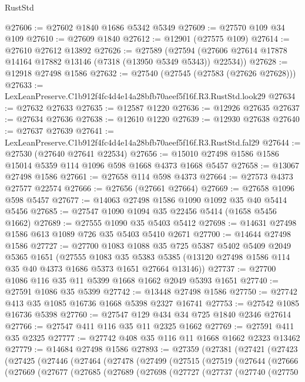 \begin{lexlean}{RustStd}
\begin{coremodule}
@27606 := @27602 @1840 @1686 @5342 @5349
@27609 := @27570 @109 @34 @109
@27610 := @27609 @1840
@27612 := @12901 (@27575 @109)
@27614 := @27610 @27612 @13892
@27626 := @27589
    (@27594 (@27606 @27614 @17878 @14164 @17882 @13146 (@7318 (@13950 @5349 @5343)) @22534))
@27628 := @12918 @27498 @1586
@27632 := @27540 (@27545 (@27583 (@27626 @27628)))
@27633 := LexLeanPreserve.C1b912f4fc4d4e14a28bfb70aeef5f16f.R3.RustStd.look29
@27634 := @27632 @27633
@27635 := @12587 @1220
@27636 := @12926 @27635
@27637 := @27634 @27636
@27638 := @12610 @1220
@27639 := @12930 @27638
@27640 := @27637 @27639
@27641 := LexLeanPreserve.C1b912f4fc4d4e14a28bfb70aeef5f16f.R3.RustStd.fal29
@27644 := @27530 (@27640 @27641 @22534)
@27656 := @15010 @27498 @1586 @1586 @15014 @5359 @114 @1096 @598 @1668 @4373 @1668 @5457
@27658 := @13067 @27498 @1586
@27661 := @27658 @114 @598 @4373
@27664 := @27573 @4373 @27577 @22574
@27666 := @27656 (@27661 @27664)
@27669 := @27658 @1096 @598 @5457
@27677 := @14063 @27498 @1586 @1090 @1092 @35 @40 @5414 @5456
@27685 := @27547 @1090 @1094 @35 @22456 @5414 (@1658 @5456 @1662)
@27689 := @27555 @1090 @35 @5403 @5412
@27698 := @14631 @27498 @1586 @613 @1089 @726 @35 @5403 @5410 @2671
@27700 := @14644 @27498 @1586
@27727 := @27700
    @1083
    @1088
    @35
    @725
    @5387
    @5402
    @5409
    @2049
    @5365
    @1651
    (@27555
      @1083
      @35
      @5383
      @5385
      (@13120 @27498 @1586 @114 @35 @40 @4373 @1686 @5373 @1651 @27664 @13146))
@27737 := @27700 @1086 @116 @35 @11 @5399 @1668 @1662 @2049 @5393 @1651
@27740 := @27591 @1086 @35 @5399
@27742 := @13448 @27498 @1586
@27750 := @27742 @413 @35 @1085 @16736 @1668 @5398 @2327 @16741
@27753 := @27542 @1085 @16736 @5398
@27760 := @27547 @129 @434 @34 @725 @1840 @2346 @27614
@27766 := @27547 @411 @116 @35 @11 @2325 @1662
@27769 := @27591 @411 @35 @2325
@27777 := @27742 @408 @35 @116 @11 @1668 @1662 @2323 @13462
@27779 := @14684 @27498 @1586
@27893 := @27359
    (@27381
      (@27421
        (@27423
          (@27425
            (@27446
              (@27464
                (@27478
                  (@27499
                    (@27515
                      (@27519
                        (@27644
                          (@27666
                            (@27669
                              (@27677
                                (@27685
                                  (@27689
                                    (@27698
                                      (@27727
                                        (@27737
                                          (@27740
                                            (@27750

\end{coremodule}
\end{lexlean}

